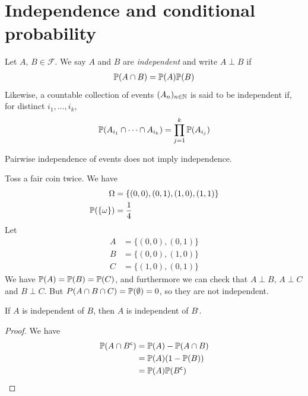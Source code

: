 \documentclass{../template/note}
\begin{document}
    \section{Independence and conditional probability}
    
    \begin{definition}[Independence]
        Let \(A\), \(B \in \mathcal F\). We say \(A\) and \(B\) are \emph{independent} and write \(A \perp B\) if
        \begin{align*}
            \mathbb P(A \cap B) = \mathbb P(A) \mathbb P(B)
        \end{align*}
        Likewise, a countable collection of events \((A_n)_{n \in \mathbb N}\) is said to be independent if, for distinct \(i_1, \dots, i_k\),
        \begin{align*}
            \mathbb P(A_{i_1} \cap \dots \cap A_{i_k}) = \prod_{j=1}^k \mathbb P(A_{i_j})
        \end{align*}
    \end{definition}
    
    \begin{remark*}
        Pairwise independence of events does not imply independence.
    \end{remark*}
    
    \begin{example*}
        Toss a fair coin twice. We have
        \begin{align*}
            \Omega &= \{(0, 0), (0, 1), (1, 0), (1, 1)\} \\
            \mathbb P(\{\omega\}) &= \frac 1 4
        \end{align*}
        Let
        \begin{align*}
            A &= \{(0, 0), (0, 1)\} \\
            B &= \{(0, 0), (1, 0)\} \\
            C &= \{(1, 0), (0, 1)\}
        \end{align*}
        We have \(\mathbb P(A) = \mathbb P(B) = \mathbb P(C)\), and furthermore we can check that \(A \perp B\), \(A \perp C\) and \(B \perp C\). But \(\\P(A \cap B \cap C) = \mathbb P(\emptyset) = 0\), so they are not independent.
    \end{example*}
    
    \begin{proposition}
        If \(A\) is independent of \(B\), then \(A\) is independent of \(B^\comp\).
    \end{proposition}
    
    \begin{proof}
        We have
        \begin{align*}
            \mathbb P(A \cap B^{\mathsf{c}}) &= \mathbb P(A) - \mathbb P(A \cap B) \\
            &= \mathbb P(A)(1 - \mathbb P(B)) \\
            &= \mathbb P(A)\mathbb P(B^{\mathsf{c}})
        \end{align*}
    \end{proof}
    
\end{document}
